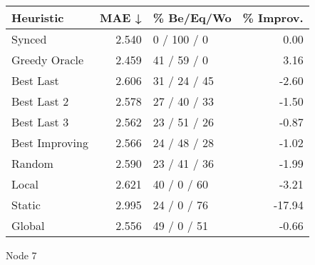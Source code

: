 \begin{tabular}{lrlr}
\toprule
\textbf{Heuristic} & \textbf{MAE ↓} & \textbf{\% Be/Eq/Wo} & \textbf{\% Improv.} \\
\midrule
            Synced &          2.540 &          0 / 100 / 0 &                0.00 \\
     Greedy Oracle &          2.459 &          41 / 59 / 0 &                3.16 \\
         Best Last &          2.606 &         31 / 24 / 45 &               -2.60 \\
       Best Last 2 &          2.578 &         27 / 40 / 33 &               -1.50 \\
       Best Last 3 &          2.562 &         23 / 51 / 26 &               -0.87 \\
    Best Improving &          2.566 &         24 / 48 / 28 &               -1.02 \\
            Random &          2.590 &         23 / 41 / 36 &               -1.99 \\
             Local &          2.621 &          40 / 0 / 60 &               -3.21 \\
            Static &          2.995 &          24 / 0 / 76 &              -17.94 \\
            Global &          2.556 &          49 / 0 / 51 &               -0.66 \\
\bottomrule
\end{tabular}
\caption{Node 7}
\label{tab:hr_iid_lr05_le1_bs2_7}

